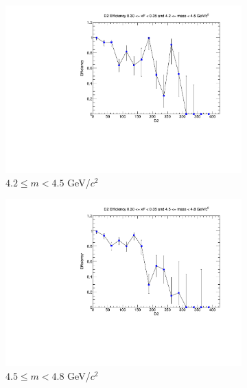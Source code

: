 \begin{figure}[p]
    \centering
    \begin{subfigure}[b]{0.32\textwidth}
        \centering
        \includegraphics[width=\textwidth]{./kTrackerEfficiencyPlots/D2_Efficiency_xF6_mass0.pdf}
        \caption{$4.2 \leq m < 4.5$ GeV/$c^2$}
        \label{fig:xF6_mass0}
    \end{subfigure}
    \hfill
    \begin{subfigure}[b]{0.32\textwidth}
        \centering
        \includegraphics[width=\textwidth]{./kTrackerEfficiencyPlots/D2_Efficiency_xF6_mass1.pdf}
        \caption{$4.5 \leq m < 4.8$ GeV/$c^2$}
        \label{fig:xF6_mass1}
    \end{subfigure}
    \hfill
    \begin{subfigure}[b]{0.32\textwidth}

\end{subfigure}
\end{figure}

